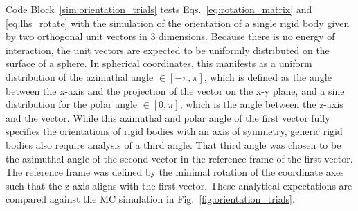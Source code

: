 \documentclass[
  9pt,
  bestpractices,
]{livecoms}
\begin{document}
Code Block~\ref{sim:orientation_trials} tests Eqs.~\ref{eq:rotation_matrix} and \ref{eq:lhs_rotate} with the simulation of the orientation of a single rigid body given by two orthogonal unit vectors in $3$ dimensions.
Because there is no energy of interaction, the unit vectors are expected to be uniformly distributed on the surface of a sphere.
In spherical coordinates, this manifests as a uniform distribution of the azimuthal angle $\in [-\pi,\pi]$, which is defined as the angle between the x-axis and the projection of the vector on the x-y plane, and a sine distribution for the polar angle $\in [0,\pi]$, which is the angle between the z-axis and the vector.
While this azimuthal and polar angle of the first vector fully specifies the orientations of rigid bodies with an axis of symmetry, generic rigid bodies also require analysis of a third angle.
That third angle was chosen to be the azimuthal angle of the second vector in the reference frame of the first vector.
The reference frame was defined by the minimal rotation of the coordinate axes such that the z-axis aligns with the first vector.
These analytical expectations are compared against the MC simulation in Fig.~\ref{fig:orientation_trials}.

\begin{figure}

\end{figure}
\end{document}

